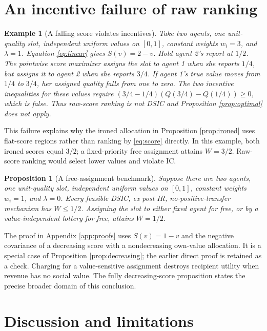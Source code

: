 \documentclass[11pt]{article}
\newtheorem{proposition}{Proposition}
\newtheorem{example}{Example}
\begin{document}
\section{An incentive failure of raw ranking}\label{sec:limits}

\begin{example}[A falling score violates incentives]\label{ex:fall}
Take two agents, one unit-quality slot, independent uniform values on $[0,1]$, constant weights $w_i=3$, and $\lambda=1$. Equation \eqref{eq:linear} gives $S(v)=2-v$. Hold agent 2's report at $1/2$. The pointwise score maximizer assigns the slot to agent 1 when she reports $1/4$, but assigns it to agent 2 when she reports $3/4$. If agent 1's true value moves from $1/4$ to $3/4$, her assigned quality falls from one to zero. The two incentive inequalities for these values require $(3/4-1/4)(Q(3/4)-Q(1/4))\ge0$, which is false. Thus raw-score ranking is not DSIC and Proposition \ref{prop:optimal} does not apply.
\end{example}

This failure explains why the ironed allocation in Proposition \ref{prop:ironed} uses flat-score regions rather than ranking by \eqref{eq:score} directly. In this example, both ironed scores equal $3/2$; a fixed-priority free assignment attains $W=3/2$. Raw-score ranking would select lower values and violate IC.

\begin{proposition}[A free-assignment benchmark]\label{prop:free}
Suppose there are two agents, one unit-quality slot, independent uniform values on $[0,1]$, constant weights $w_i=1$, and $\lambda=0$. Every feasible DSIC, ex post IR, no-positive-transfer mechanism has $W\le1/2$. Assigning the slot to either fixed agent for free, or by a value-independent lottery for free, attains $W=1/2$.
\end{proposition}

The proof in Appendix \ref{app:proofs} uses $S(v)=1-v$ and the negative covariance of a decreasing score with a nondecreasing own-value allocation. It is a special case of Proposition \ref{prop:decreasing}; the earlier direct proof is retained as a check. Charging for a value-sensitive assignment destroys recipient utility when revenue has no social value. The fully decreasing-score proposition states the precise broader domain of this conclusion.

\section{Discussion and limitations}\label{sec:discussion}
\end{document}
